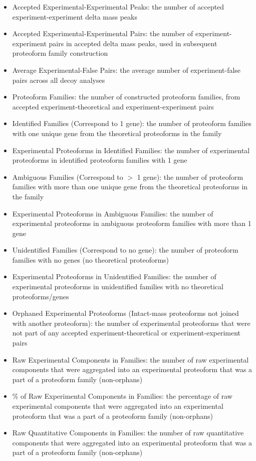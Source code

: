 \begin{itemize}
\begin{itemize}
\item Accepted Experimental-Experimental Peaks: the number of accepted experiment-experiment delta mass peaks
\item Accepted Experimental-Experimental Pairs: the number of experiment-experiment pairs in accepted delta mass peaks, used in subsequent proteoform family construction
\item Average Experimental-False Pairs: the average number of experiment-false pairs across all decoy analyses
\item Proteoform Families: the number of constructed proteoform families, from accepted experiment-theoretical and experiment-experiment pairs
\item Identified Families (Correspond to 1 gene): the number of proteoform families with one unique gene from the theoretical proteoforms in the family
\item Experimental Proteoforms in Identified Families: the number of experimental proteoforms in identified proteoform families with 1 gene
\item Ambiguous Families (Correspond to $>$ 1 gene): the number of proteoform families with more than one unique gene from the theoretical proteoforms in the family
\item Experimental Proteoforms in Ambiguous Families: the number of experimental proteoforms in ambiguous proteoform families with more than 1 gene
\item Unidentified Families (Correspond to no gene): the number of proteoform families with no genes (no theoretical proteoforms)
\item Experimental Proteoforms in Unidentified Families: the number of experimental proteoforms in unidentified families with no theoretical proteoforms/genes
\item Orphaned Experimental Proteoforms (Intact-mass proteoforms not joined with another proteoform): the number of experimental proteoforms that were not part of any accepted experiment-theoretical or experiment-experiment pairs
\item Raw Experimental Components in Families: the number of raw experimental components that were aggregated into an experimental proteoform that was a part of a proteoform family (non-orphans)
\item \% of Raw Experimental Components in Families: the percentage of raw experimental components that were aggregated into an experimental proteoform that was a part of a proteoform family (non-orphans)
\item Raw Quantitative Components in Families: the number of raw quantitative components that were aggregated into an experimental proteoform that was a part of a proteoform family (non-orphans)

\end{itemize}
\end{itemize}
